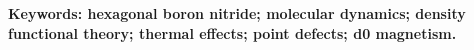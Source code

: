 
\vspace{5mm}

\noindent \textbf{Keywords: hexagonal boron nitride; molecular dynamics; density functional theory; thermal effects; point defects; d0 magnetism.} \textit{} %

